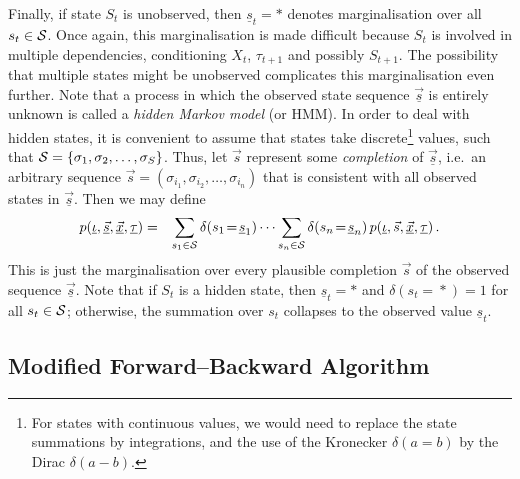 \documentclass[a4paper]{article}
\newcommand{\ui}{\underline{\iota}}
\newcommand{\ut}{\underline{\tau}}
\begin{document}
Finally, if state $S_{t}$ is unobserved, then $\underline{s}_{t}=*$  denotes marginalisation over all $s_{t}\in{\cal S}$. 
Once again, this marginalisation is made difficult because $S_t$ is involved in multiple dependencies, conditioning $X_t$, $\tau_{t+1}$ and possibly $S_{t+1}$.
The possibility that multiple states might be unobserved complicates this marginalisation even further.
Note that a process in which the observed state sequence $\underline{\vec{s}}$ is entirely unknown is called a {\em hidden Markov model} (or HMM).
In order to deal with hidden states, it is convenient to assume that states take discrete\footnote{For states with continuous values, we would need to replace 
the state summations by integrations, and the use of the Kronecker $\delta(a\!=\!b)$ by the Dirac $\delta(a-b)$.} 
values, such that ${\cal S}=\left\{\sigma_1,\sigma_2,\ldots,\sigma_S\right\}$.
Thus, let $\vec{s}$ represent some {\em completion} of $\underline{\vec{s}}$, i.e.\ an arbitrary sequence $\vec{s}=(\sigma_{i_1},\sigma_{i_2},\ldots,\sigma_{i_n})$ that is consistent with all observed states in $\underline{\vec{s}}$.
Then we may define
\begin{eqnarray}
p(\ui,\underline{\vec{s}},\underline{\vec{x}},\ut) & = &
\sum_{s_1\in{\cal S}}\delta(s_1\!=\!\underline{s}_1)
\cdots
\sum_{s_n\in{\cal S}}\delta(s_n\!=\!\underline{s}_n)
\,p(\ui,\vec{s},\underline{\vec{x}},\ut)\,.
\label{eq:state-marg}
\end{eqnarray}
This is just the marginalisation over every plausible completion $\vec{s}$ of the observed sequence $\underline{\vec{s}}$.
Note that if $S_t$ is a hidden state, then $\underline{s}_t=*$ and $\delta(s_t\!=\!*)=1$ for all $s_t\in{\cal S}$; otherwise, the summation over $s_t$ collapses to the observed value $\underline{s}_t$.


\subsection{Modified Forward--Backward Algorithm}\label{sec:forward-backward}
\end{document}
